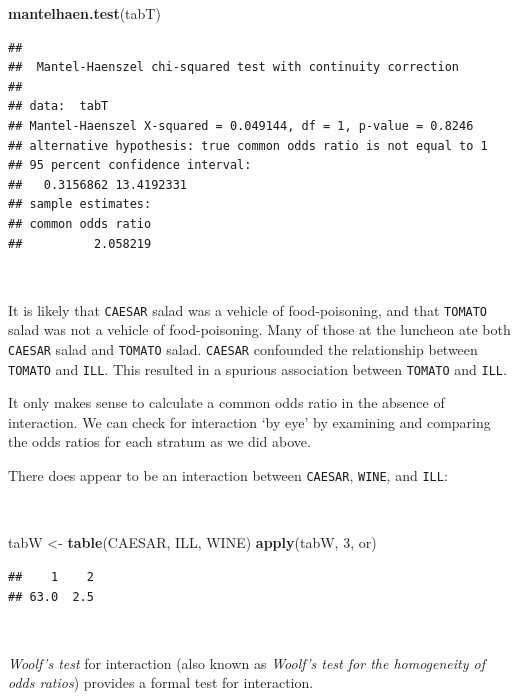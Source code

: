 \documentclass[12pt,a4paper]{book}
\newenvironment{Shaded}{\begin{snugshade}}{\end{snugshade}}
\newcommand{\KeywordTok}[1]{\textcolor[rgb]{0.13,0.29,0.53}{\textbf{#1}}}
\newcommand{\DecValTok}[1]{\textcolor[rgb]{0.00,0.00,0.81}{#1}}
\newcommand{\StringTok}[1]{\textcolor[rgb]{0.31,0.60,0.02}{#1}}
\newcommand{\NormalTok}[1]{#1}
\theoremstyle{definition}
\theoremstyle{definition}
\theoremstyle{definition}
\theoremstyle{remark}
\begin{document}
\begin{Shaded}
\begin{Highlighting}[]
\KeywordTok{mantelhaen.test}\NormalTok{(tabT)}
\end{Highlighting}
\end{Shaded}

\begin{verbatim}
## 
##  Mantel-Haenszel chi-squared test with continuity correction
## 
## data:  tabT
## Mantel-Haenszel X-squared = 0.049144, df = 1, p-value = 0.8246
## alternative hypothesis: true common odds ratio is not equal to 1
## 95 percent confidence interval:
##   0.3156862 13.4192331
## sample estimates:
## common odds ratio 
##          2.058219
\end{verbatim}

~

It is likely that \texttt{CAESAR} salad was a vehicle of food-poisoning,
and that \texttt{TOMATO} salad was not a vehicle of food-poisoning. Many
of those at the luncheon ate both \texttt{CAESAR} salad and
\texttt{TOMATO} salad. \texttt{CAESAR} confounded the relationship
between \texttt{TOMATO} and \texttt{ILL}. This resulted in a spurious
association between \texttt{TOMATO} and \texttt{ILL}.

It only makes sense to calculate a common odds ratio in the absence of
interaction. We can check for interaction `by eye' by examining and
comparing the odds ratios for each stratum as we did above.

\newpage

There does appear to be an interaction between \texttt{CAESAR},
\texttt{WINE}, and \texttt{ILL}:

~

\begin{Shaded}
\begin{Highlighting}[]
\NormalTok{tabW <-}\StringTok{ }\KeywordTok{table}\NormalTok{(CAESAR, ILL, WINE)}
\KeywordTok{apply}\NormalTok{(tabW, }\DecValTok{3}\NormalTok{, or)}
\end{Highlighting}
\end{Shaded}

\begin{verbatim}
##    1    2 
## 63.0  2.5
\end{verbatim}

~

\emph{Woolf's test} for interaction (also known as \emph{Woolf's test
for the homogeneity of odds ratios}) provides a formal test for
interaction.
\end{document}
